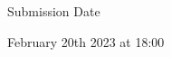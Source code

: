 \documentclass[aspectratio=169]{../latex_main/tntbeamer}  %
\begin{document}


\begin{frame}[c]{Submission Date}

    \huge
    \begin{center}
	    February 20th 2023 at 18:00
    \end{center}
\end{frame}
\end{document}
